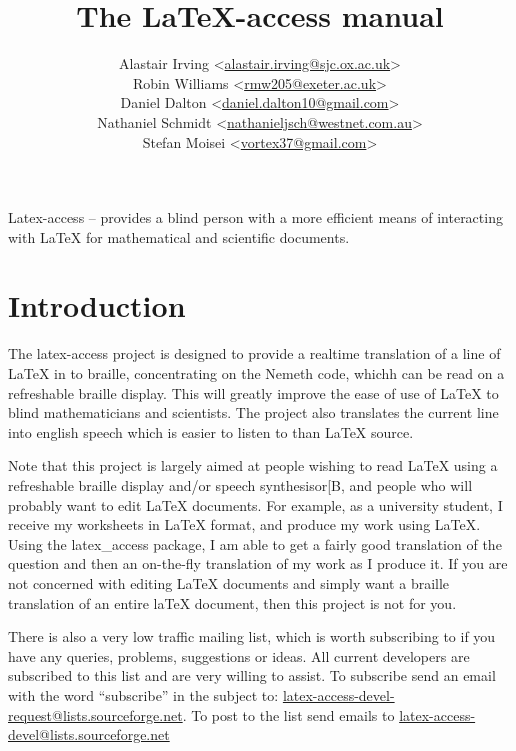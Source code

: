 \documentclass[12pt,a4paper]{report}
\begin{document}
\title{The LaTeX-access manual}
\author{Alastair Irving <\href{mailto:alastair.irving@sjc.ox.ac.uk}{alastair.irving@sjc.ox.ac.uk}>\\
  Robin  Williams <\href{mailto:rmw205@exeter.ac.uk}{rmw205@exeter.ac.uk}>\\
  Daniel Dalton <\href{mailto:<daniel.dalton10@gmail.com}{daniel.dalton10@gmail.com}>\\
  Nathaniel Schmidt <\href{mailto:nathanieljsch@westnet.com.au}{nathanieljsch@westnet.com.au}>\\
  Stefan Moisei <\href{mailto:vortex37@gmail.com}{vortex37@gmail.com}>}
\maketitle
\tableofcontents

Latex-access -- provides a blind person with a more efficient means of
interacting with LaTeX for mathematical and scientific documents.

\chapter{Introduction}
\label{ch-introduction}

The latex-access project is designed to provide a realtime
translation of a line of LaTeX in to braille, concentrating
on the Nemeth code, whichh can be read on a refreshable braille
display. This will greatly improve the ease of use of
LaTeX to blind mathematicians and scientists. The project also
translates the current line into english speech which is
easier to listen to than LaTeX source.

Note that this project is largely aimed at people wishing
to read LaTeX using a refreshable braille display and/or
speech synthesisor[B, and people who will probably
want to edit LaTeX documents. For example, as a
university student,
I receive my worksheets in LaTeX format, and
produce my work using LaTeX. Using the latex\_access
package, I am able to
get a fairly good translation of the question
and then an on-the-fly translation of my work as
I produce it. If you are
not concerned with editing LaTeX documents
and simply want a braille translation of an
entire laTeX document, then this
project is not for you.

There is also a very low traffic mailing list, which is worth subscribing to if you have any
queries, problems, suggestions or ideas. All current developers are
subscribed to this list and are very willing to assist. To subscribe
send an email with the word ``subscribe'' in the subject to:
\href{mailto:latex-access-devel-request@lists.sourceforge.net}{latex-access-devel-request@lists.sourceforge.net}. To
post to the list send emails to \href{mailto:latex-access-devel@lists.sourceforge.net}{latex-access-devel@lists.sourceforge.net}
\end{document}
